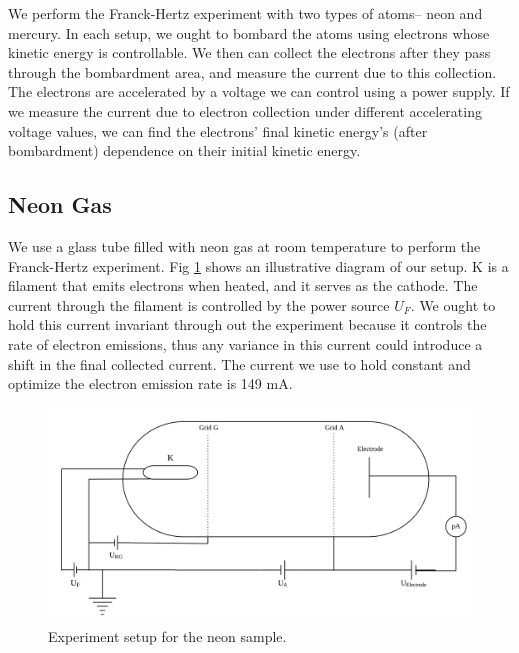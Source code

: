 \documentclass[prb,preprint]{revtex4-1}
\begin{document}
We perform the Franck-Hertz experiment with two types of atoms-- neon and mercury. In each setup, we ought to bombard the atoms using electrons whose kinetic energy is controllable. We then can collect the electrons after they pass through the bombardment area, and measure the current due to this collection. The electrons are accelerated by a voltage we can control using a power supply. If we measure the current due to electron collection under different accelerating voltage values, we can find the electrons' final kinetic energy's (after bombardment) dependence on their initial kinetic energy.

\subsection{Neon Gas}

We use a glass tube filled with neon gas at room temperature to perform the Franck-Hertz experiment. Fig \ref{figneon} shows an illustrative diagram of our setup. K is a filament that emits electrons when heated, and it serves as the cathode. The current through the filament is controlled by the power source $U_{F}$. We ought to hold this current invariant through out the experiment because it controls the rate of electron emissions, thus any variance in this current could introduce a shift in the final collected current. The current we use to hold constant and optimize the electron emission rate is 149 mA.

\begin{figure}
    \centering
    \includegraphics[width=\textwidth]{figneon.png}
    \caption{Experiment setup for the neon sample.}
    \label{figneon}
    \end{figure}
\end{document}
